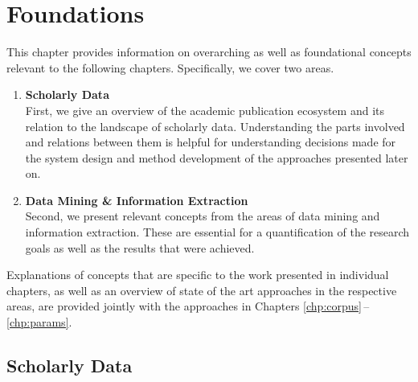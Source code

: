 \chapter{Foundations}
\label{chp:foundations}

This chapter provides information on overarching as well as foundational concepts relevant to the following chapters. Specifically, we cover two areas.

\begin{enumerate}
    \item \textbf{Scholarly Data}\\
        First, we give an overview of the academic publication ecosystem and its relation to the landscape of scholarly data. Understanding the parts involved and relations between them is helpful for understanding decisions made for the system design and method development of the approaches presented later on.
    \item \textbf{Data Mining \& Information Extraction}\\
        Second, we present relevant concepts from the areas of data mining and information extraction. These are essential for a quantification of the research goals as well as the results that were achieved.
\end{enumerate}

Explanations of concepts that are specific to the work presented in individual chapters, as well as an overview of state of the art approaches in the respective areas, are provided jointly with the approaches in Chapters \ref{chp:corpus}\,--\,\ref{chp:params}.

\section{Scholarly Data}



